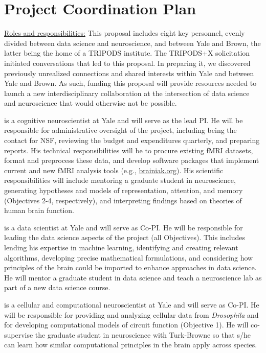 \def\person#1{\vskip4pt\noindent{\bfseries #1}}
\let\blurb\person

\section*{Project Coordination Plan}
\underline{Roles and responsibilities:} This proposal includes eight key
personnel, evenly divided between data science and neuroscience, and
between Yale and Brown, the latter being the home of a TRIPODS
institute. The TRIPODS+X solicitation initiated conversations that led
to this proposal. In preparing it, we discovered previously unrealized
connections and shared interests within Yale and between Yale and
Brown. As such, funding this proposal will provide resources needed to
launch a new interdisciplinary collaboration at the intersection of
data science and neuroscience that would otherwise not be possible.

\person{Nick Turk-Browne} is a cognitive neuroscientist at Yale and will serve
as the lead PI. He will be responsible for administrative oversight of
the project, including being the contact for NSF, reviewing the budget
and expenditures quarterly, and preparing reports. His technical
responsibilities will be to procure existing fMRI datasets, format and
preprocess these data, and develop software packages that implement
current and new fMRI analysis tools (e.g., \href{http://www.brainiak.org}{brainiak.org}). His
scientific responsibilities will include mentoring a graduate student
in neuroscience, generating hypotheses and models of
representation, attention, and memory (Objectives 2-4, respectively),
and interpreting findings based on theories of human brain function.


\person{John Lafferty} is a data scientist at Yale and will serve as Co-PI.
He will be responsible for leading the data science aspects of the
project (all Objectives). This includes lending his expertise in
machine learning, identifying and creating relevant algorithms,
developing precise mathematical formulations, and considering how
principles of the brain could be imported to enhance approaches in
data science. He will mentor a graduate student in data science and
teach a neuroscience lab as part of a new data science course.

\person{Damon Clark} is a cellular and computational neuroscientist at Yale and
will serve as Co-PI. He will be responsible for providing and
analyzing cellular data from {\it Drosophila} and for developing
computational models of circuit function (Objective 1). He will
co-supervise the graduate student in neuroscience with Turk-Browne so that s/he 
can learn how similar computational principles in the brain apply across species.

